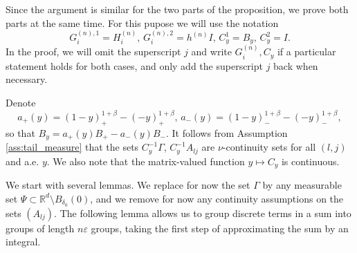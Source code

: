 \documentclass[11pt,reqno]{amsart}
\numberwithin{equation}{section}
\theoremstyle{definition}
\theoremstyle{remark}
\theoremstyle{definition}
\newcommand{\eps}{\varepsilon}
\newcommand{\RR}{\mathbb{R}}
\begin{document}
Since the argument is similar for the two parts of the proposition,  we prove both parts at the same time. For this pupose we will use the notation 
\begin{equation}\label{eq:unify_coeff}
   G_i^{(n), 1} = H_i^{(n)}, \, G_i^{(n), 2} = h^{(n)}I, \, C_y^{1} = B_y, \, C_y^2 = I. 
\end{equation}
In the proof, we will omit the superscript $j$ and write
$G_i^{(n)}, C_y$ if a particular statement  holds for both cases, and
only add the superscript $j$ back when necessary. 

Denote 
\begin{equation}\label{def:a_y}
    a_+(y) =  (1 - y)_+^{1+\beta} - (-y)_+^{1+\beta}, \, a_-(y) = (1 -
    y)_-^{1+\beta} - (-y)_-^{1+\beta}, 
  \end{equation}
so that $B_y = a_+(y)B_+ - a_-(y) B_-$. It follows 
from Assumption \ref{ass:tail_measure}  that the sets
$C_y^{-1}\Gamma$, $C_y^{-1}A_{lj}$ 
are 
$\nu$-continuity sets for all $(l,j)$ and a.e. $y$.  We also note that
the matrix-valued  function
$y \mapsto C_y$ is continuous. 

We start with several lemmas. We replace for now the set $\Gamma$ by
any measurable set $\Psi 
\subset \RR^d \setminus B_{\delta_0}(0)$, and we  remove for now any 
continuity assumptions on the sets $(A_{lj})$. 
The following lemma allows us to group discrete terms in a sum into
groups of length $n\eps$ groups,  taking the first step of
approximating the sum by an integral.
\end{document}
